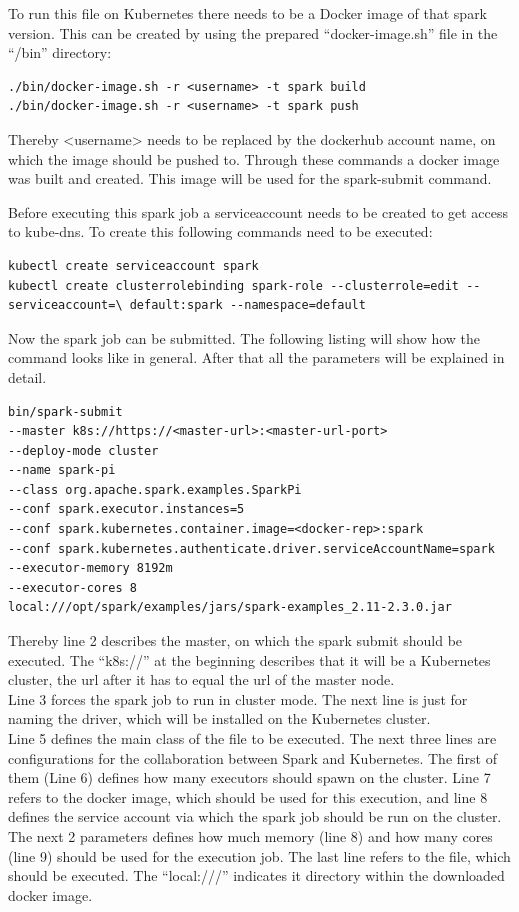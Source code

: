 To run this file on Kubernetes there needs to be a Docker image of that spark version. This can be created by using the prepared ``docker-image.sh'' file in the ``/bin'' directory:
\begin{lstlisting}[caption={Create Spark 2.3.0 docker image},captionpos=b]
./bin/docker-image.sh -r <username> -t spark build
./bin/docker-image.sh -r <username> -t spark push
\end{lstlisting}
Thereby <username> needs to be replaced by the dockerhub account name, on which the image should be pushed to. Through these commands a docker image was built and created. This image will be used for the spark-submit command.

Before executing this spark job a serviceaccount needs to be created to get access to kube-dns. To create this following commands need to be executed:
\begin{lstlisting}[caption={Create spark serviceaccount for Kubernetes},captionpos=b]
kubectl create serviceaccount spark
kubectl create clusterrolebinding spark-role --clusterrole=edit --serviceaccount=\ default:spark --namespace=default
\end{lstlisting}

Now the spark job can be submitted. The following listing will show how the command looks like in general. After that all the parameters will be explained in detail.

\begin{lstlisting}[caption={Spark-submit to Kubernetes master},captionpos=b]
bin/spark-submit 
--master k8s://https://<master-url>:<master-url-port> 
--deploy-mode cluster 
--name spark-pi 
--class org.apache.spark.examples.SparkPi 
--conf spark.executor.instances=5 
--conf spark.kubernetes.container.image=<docker-rep>:spark 
--conf spark.kubernetes.authenticate.driver.serviceAccountName=spark 
--executor-memory 8192m 
--executor-cores 8 
local:///opt/spark/examples/jars/spark-examples_2.11-2.3.0.jar
\end{lstlisting}

Thereby line 2 describes the master, on which the spark submit should be executed. The ``k8s://'' at the beginning describes that it will be a Kubernetes cluster, the url after it has to equal the url of the master node.\\
Line 3 forces the spark job to run in cluster mode. The next line is just for naming the driver, which will be installed on the Kubernetes cluster.\\
Line 5 defines the main class of the file to be executed. The next three lines are configurations for the collaboration between Spark and Kubernetes. The first of them (Line 6) defines how many executors should spawn on the cluster. Line 7 refers to the docker image, which should be used for this execution, and line 8 defines the service account via which the spark job should be run on the cluster.\\
The next 2 parameters defines how much memory (line 8) and how many cores (line 9) should be used for the execution job. 
The last line refers to the file, which should be executed. The ``local:///'' indicates it directory within the downloaded docker image.

